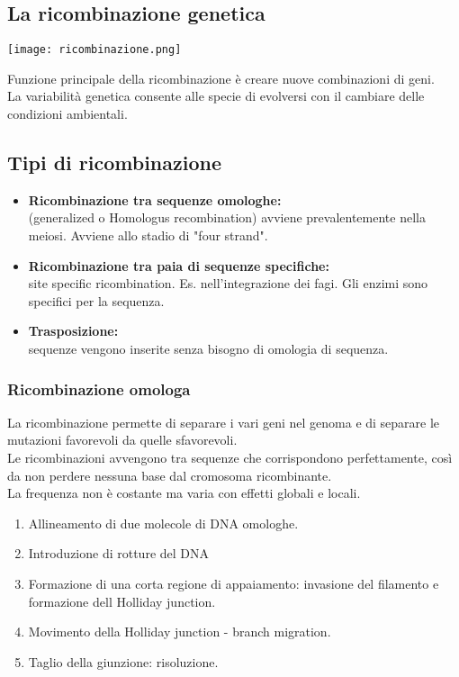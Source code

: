 \documentclass{article}
\begin{document}
\subsection*{La ricombinazione genetica}
\begin{center}
    \texttt{[image: ricombinazione.png]}
\end{center}
Funzione principale della ricombinazione è creare nuove combinazioni di geni.\\
La variabilità genetica consente alle specie di evolversi con il cambiare delle condizioni ambientali.
\subsection{Tipi di ricombinazione}
\begin{itemize}
    \item \textbf{Ricombinazione tra sequenze omologhe:}\\
    (generalized o Homologus recombination) avviene prevalentemente nella meiosi. Avviene allo stadio di "four strand".
    \item \textbf{Ricombinazione tra paia di sequenze specifiche:}\\
    site specific ricombination. Es. nell'integrazione dei fagi. Gli enzimi sono specifici per la sequenza.
    \item \textbf{Trasposizione:}\\
    sequenze vengono inserite senza bisogno di omologia di sequenza.
\end{itemize}
\subsubsection{Ricombinazione omologa}
La ricombinazione permette di separare i vari geni nel genoma e di separare le mutazioni favorevoli da quelle sfavorevoli.\\
Le ricombinazioni avvengono tra sequenze che corrispondono perfettamente, così da non perdere nessuna base dal cromosoma ricombinante.\\
La frequenza non è costante ma varia con effetti globali e locali.
\begin{enumerate}
    \item Allineamento di due molecole di DNA omologhe.
    \item Introduzione di rotture del DNA
    \item Formazione di una corta regione di appaiamento: invasione del filamento e formazione dell Holliday junction.
    \item Movimento della Holliday junction - branch migration.
    \item Taglio della giunzione: risoluzione.
\end{enumerate}
\end{document}
